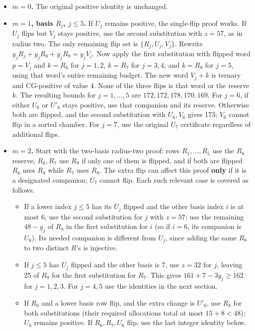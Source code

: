 \documentclass[
  11pt,
]{article}
\providecommand{\tightlist}{%
  \setlength{\itemsep}{0pt}\setlength{\parskip}{0pt}}
\begin{document}
\begin{itemize}
\item
  \textbf{\(m=0\).} The original positive identity is unchanged.
\item
  \textbf{\(m=1\), basis \(R_j\), \(j\le5\).} If \(U_j\) remains
  positive, the single-flip proof works. If \(U_j\) flips but \(V_j\)
  stays positive, use the second substitution with \(z=57\), as in
  radius two. The only remaining flip set is \(\{R_j,U_j,V_j\}\).
  Rewrite \(y_jR_j+y_jR_8+y_jR_9=y_jV_j\). Now apply the first
  substitution with flipped word \(p=V_j\) and \(k=R_6\) for \(j=1,2\),
  \(k=R_7\) for \(j=3,4\), and \(k=R_8\) for \(j=5\), using that word's
  entire remaining budget. The new word \(V_j+k\) is ternary and
  CG-positive of value 4. None of the three flips is that word or the
  reserve \(k\). The resulting bounds for \(j=1,\ldots,5\) are
  \(172,172,178,170,169\). For \(j=6\), if either \(U_6\) or \(U'_6\)
  stays positive, use that companion and its reserve. Otherwise both are
  flipped, and the second substitution with \(U_6,V_6\) gives 173;
  \(V_6\) cannot flip in a sorted chamber. For \(j=7\), use the original
  \(U_7\) certificate regardless of additional flips.
\item
  \textbf{\(m=2\).} Start with the two-basis radius-two proof: rows
  \(R_1,\ldots,R_5\) use the \(R_8\) reserve, \(R_6,R_7\) use \(R_9\) if
  only one of them is flipped, and if both are flipped \(R_6\) uses
  \(R_8\) while \(R_7\) uses \(R_9\). The extra flip can affect this
  proof \textbf{only} if it is a designated companion; \(U_7\) cannot
  flip. Each such relevant case is covered as follows.

  \begin{itemize}
  \tightlist
  \item
    If a lower index \(j\le5\) has its \(U_j\) flipped and the other
    basis index \(i\) is at most 6, use the second substitution for
    \(j\) with \(z=57\); use the remaining \(48-y_j\) of \(R_8\) in the
    first substitution for \(i\) (so if \(i=6\), its companion is
    \(U_6\)). Its needed companion is different from \(U_j\), since
    adding the same \(R_8\) to two distinct \(R\)'s is injective.
  \item
    If \(j\le5\) has \(U_j\) flipped and the other basis is 7, use
    \(z=32\) for \(j\), leaving 25 of \(R_9\) for the first substitution
    for \(R_7\). This gives \(161+7-3y_j\ge162\) for \(j=1,2,3\). For
    \(j=4,5\) use the identities in the next section.
  \item
    If \(R_6\) and a lower basis row flip, and the extra change is
    \(U'_6\), use \(R_8\) for both substitutions (their required
    allocations total at most \(15+8<48\)); \(U_6\) remains positive. If
    \(R_6,R_7,U_6\) flip, use the last integer identity below.
  \end{itemize}


\end{itemize}
\end{document}
